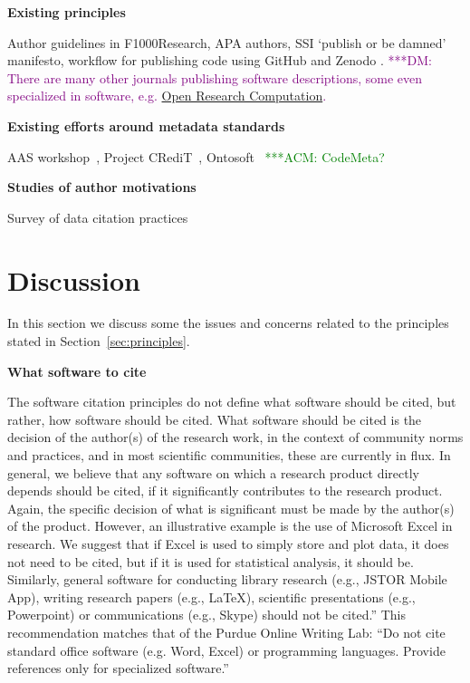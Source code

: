 \documentclass[11pt, oneside]{amsart}
\newcommand{\dmnote}[1]{ {\textcolor{purple} { ***DM: #1 }}} %
\newcommand{\acmnote}[1]{ {\textcolor{green} { ***ACM: #1 }}} %
\begin{document}
\textbf{Existing principles}

Author guidelines in F1000Research, APA authors, SSI `publish or be damned'
\cite{ssi-publish-or-be-damned} manifesto, workflow for publishing code using
GitHub and Zenodo \cite{github-citable-code-guide}.
\dmnote{There are many other journals publishing software descriptions, some even specialized in software, e.g. \href{http://www.openresearchcomputation.com}{Open Research Computation}.}

\textbf{Existing efforts around metadata standards}

AAS workshop~\cite{aas-software-index}, Project CRediT~\cite{casrai-credit}, Ontosoft~\cite{ontosoft}
\acmnote{ CodeMeta? }

\textbf{Studies of author motivations}

Survey of data citation practices \cite{Kratz_2015}


\section{Discussion}
\label{sec:discussion}

In this section we discuss some the issues and concerns related to the principles stated in Section~\ref{sec:principles}.


\textbf{What software to cite}

The software citation principles do not define what software should be cited, but rather, how software should be cited.
What software should be cited is the decision of the author(s) of the research work, in the context of community norms and practices, and in most scientific communities, these are currently in flux.
In general, we believe that any software on which a research product directly depends should be cited, if it significantly contributes to the research product.
Again, the specific decision of what is significant must be made by the author(s) of the product.
However, an illustrative example is the use of Microsoft Excel in research.
We suggest that if Excel is used to simply store and plot data, it does not need to be cited, but if it is used for statistical analysis, it should be.  Similarly, general software for conducting library research (e.g., JSTOR Mobile App), writing research papers (e.g., \LaTeX), scientific presentations (e.g., Powerpoint) or communications (e.g., Skype) should not be cited.''
This recommendation matches that of the Purdue Online Writing Lab: ``Do not cite standard office software (e.g. Word, Excel) or programming languages.  Provide references only for specialized software.''~\cite{powl-citing-software}
\end{document}
